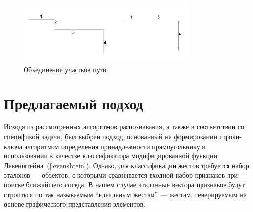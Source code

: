 \documentclass[a5paper]{article}
\begin{document}
\begin{figure} [ht]
  \begin{center}
    \includegraphics[width=0.8\textwidth, bb=0 0 500 200]{04-qt.png}
    \caption{Объединение участков пути}
    \label{qt}
  \end{center}
\end{figure}

\section{Предлагаемый подход}
\label{rectAlgorithm}
Исходя из рассмотренных алгоритмов распознавания, а также в соответствии со спецификой задачи, был выбран подход, основанный на формировании строки-ключа алгоритмом определения принадлежности прямоугольнику и использовании в качестве классификатора модифицированной функции Левенштейна~(\ref{levenshtein}). Однако, для классификации жестов требуется набор эталонов --- объектов, с которыми сравнивается входной набор признаков при поиске ближайшего соседа. В нашем случае эталонные вектора признаков будут строиться по так называемым ``идеальным жестам'' --- жестам, генерируемым на основе графического представления элементов. 
\end{document}
